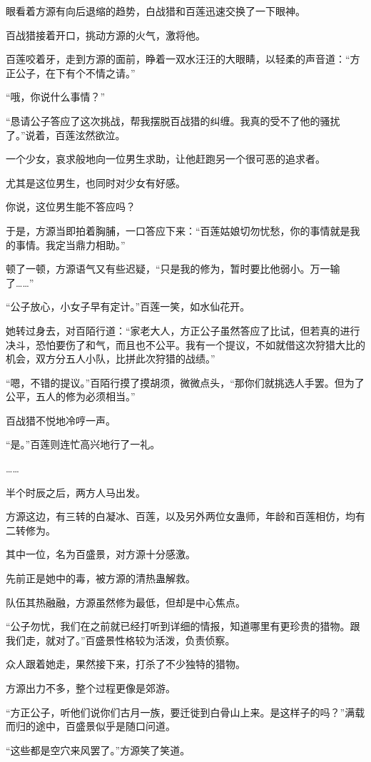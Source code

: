\begin{this_body}
眼看着方源有向后退缩的趋势，白战猎和百莲迅速交换了一下眼神。

百战猎接着开口，挑动方源的火气，激将他。

百莲咬着牙，走到方源的面前，睁着一双水汪汪的大眼睛，以轻柔的声音道：“方正公子，在下有个不情之请。”

“哦，你说什么事情？”

“恳请公子答应了这次挑战，帮我摆脱百战猎的纠缠。我真的受不了他的骚扰了。”说着，百莲泫然欲泣。

一个少女，哀求般地向一位男生求助，让他赶跑另一个很可恶的追求者。

尤其是这位男生，也同时对少女有好感。

你说，这位男生能不答应吗？

于是，方源当即拍着胸脯，一口答应下来：“百莲姑娘切勿忧愁，你的事情就是我的事情。我定当鼎力相助。”

顿了一顿，方源语气又有些迟疑，“只是我的修为，暂时要比他弱小。万一输了……”

“公子放心，小女子早有定计。”百莲一笑，如水仙花开。

她转过身去，对百陌行道：“家老大人，方正公子虽然答应了比试，但若真的进行决斗，恐怕要伤了和气，而且也不公平。我有一个提议，不如就借这次狩猎大比的机会，双方分五人小队，比拼此次狩猎的战绩。”

“嗯，不错的提议。”百陌行摸了摸胡须，微微点头，“那你们就挑选人手罢。但为了公平，五人的修为必须相当。”

百战猎不悦地冷哼一声。

“是。”百莲则连忙高兴地行了一礼。

……

半个时辰之后，两方人马出发。

方源这边，有三转的白凝冰、百莲，以及另外两位女蛊师，年龄和百莲相仿，均有二转修为。

其中一位，名为百盛景，对方源十分感激。

先前正是她中的毒，被方源的清热蛊解救。

队伍其热融融，方源虽然修为最低，但却是中心焦点。

“公子勿忧，我们在之前就已经打听到详细的情报，知道哪里有更珍贵的猎物。跟我们走，就对了。”百盛景性格较为活泼，负责侦察。

众人跟着她走，果然接下来，打杀了不少独特的猎物。

方源出力不多，整个过程更像是郊游。

“方正公子，听他们说你们古月一族，要迁徙到白骨山上来。是这样子的吗？”满载而归的途中，百盛景似乎是随口问道。

“这些都是空穴来风罢了。”方源笑了笑道。


\end{this_body}

